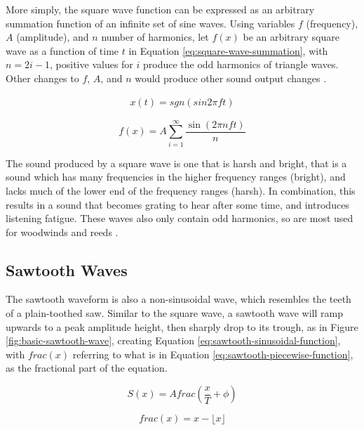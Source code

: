 More simply, the square wave function can be expressed as an arbitrary summation function of an infinite set of sine waves. Using variables $f$ (frequency), $A$ (amplitude), and $n$ number of harmonics, let $f(x)$ be an arbitrary square wave as a function of time $t$ in Equation \ref{eq:square-wave-summation}, with $n = 2i - 1$, positive values for $i$ produce the odd harmonics of triangle waves. Other changes to $f$, $A$, and $n$ would produce other sound output changes \cite{Wellesley_College_Staff_2021}.

\begin{align}
	x(t) = sgn(sin2\pi ft)
	\label{eq:square-wave-function}
\end{align} 

\begin{equation}
	f(x) = A\sum_{i=1}^{\infty}\frac{\sin(2\pi nft)}{n}
	\label{eq:square-wave-summation}
\end{equation}

The sound produced by a square wave is one that is harsh and bright, that is a sound which has many frequencies in the higher frequency ranges (bright), and lacks much of the lower end of the frequency ranges (harsh). In combination, this results in a sound that becomes grating to hear after some time, and introduces listening fatigue. These waves also only contain odd harmonics, so are most used for woodwinds and reeds \cite{Dowsett_2016}. 

\subsection{Sawtooth Waves}
The sawtooth waveform is also a non-sinusoidal wave, which resembles the teeth of a plain-toothed saw. Similar to the square wave, a sawtooth wave will ramp upwards to a peak amplitude height, then sharply drop to its trough, as in Figure \ref{fig:basic-sawtooth-wave}, creating Equation \ref{eq:sawtooth-sinusoidal-function}, with $frac(x)$ referring to what is in Equation \ref{eq:sawtooth-piecewise-function}, as the fractional part of the equation. 

\begin{equation}
	S(x) = Afrac(\frac{x}{T} + \phi)
	\label{eq:sawtooth-sinusoidal-function}
\end{equation}

\begin{equation}
	frac(x) = x - \lfloor x \rfloor
	\label{eq:sawtooth-piecewise-function}
\end{equation}

